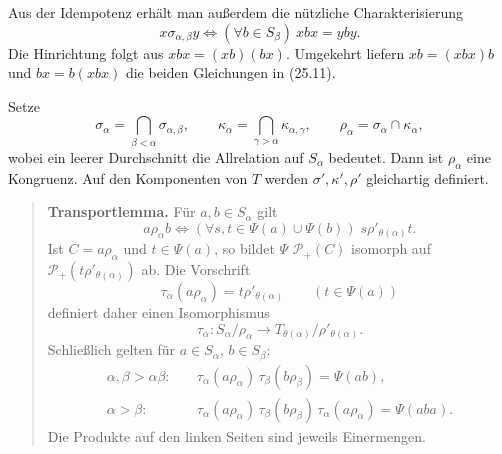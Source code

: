 \documentclass[main.tex]{subfiles}
\begin{document}
Aus der Idempotenz erhält man außerdem die nützliche Charakterisierung
\[
 x\mathrel{\sigma_{\alpha,\beta}}y
 \iff
 (\forall b\in S_\beta)\ xbx=yby.                         \tag{25.13}
\]
Die Hinrichtung folgt aus
\(xbx=(xb)(bx)\).  Umgekehrt liefern
\(xb=(xbx)b\) und \(bx=b(xbx)\) die beiden Gleichungen in
(25.11).

Setze
\[
 \sigma_\alpha=\bigcap_{\beta<\alpha}\sigma_{\alpha,\beta},
 \qquad
 \kappa_\alpha=\bigcap_{\gamma>\alpha}\kappa_{\alpha,\gamma},
 \qquad
 \rho_\alpha=\sigma_\alpha\cap\kappa_\alpha,             \tag{25.14}
\]
wobei ein leerer Durchschnitt die Allrelation auf \(S_\alpha\) bedeutet.
Dann ist \(\rho_\alpha\) eine Kongruenz.  Auf den Komponenten von \(T\)
werden \(\sigma',\kappa',\rho'\) gleichartig definiert.

\begin{quote}
\textbf{Transportlemma.}
Für \(a,b\in S_\alpha\) gilt
\[
 a\mathrel{\rho_\alpha}b
 \iff
 (\forall s,t\in\Psi(a)\cup\Psi(b))\;
 s\mathrel{\rho'_{\theta(\alpha)}}t.                    \tag{25.15}
\]
Ist \(C=a\rho_\alpha\) und \(t\in\Psi(a)\), so bildet \(\Psi\)
\(\mathcal P_+(C)\) isomorph auf
\(\mathcal P_+(t\rho'_{\theta(\alpha)})\) ab.  Die Vorschrift
\[
 \tau_\alpha(a\rho_\alpha)
   =t\rho'_{\theta(\alpha)}\qquad(t\in\Psi(a))            \tag{25.16}
\]
definiert daher einen Isomorphismus
\[
 \tau_\alpha\colon S_\alpha/\rho_\alpha
    \longrightarrow T_{\theta(\alpha)}/\rho'_{\theta(\alpha)}.
                                                                  \tag{25.17}
\]
Schließlich gelten für \(a\in S_\alpha\), \(b\in S_\beta\):
\begin{align}
 \alpha,\beta>\alpha\beta:\quad&
 \tau_\alpha(a\rho_\alpha)\,
 \tau_\beta(b\rho_\beta)=\Psi(ab),                       \tag{25.18}\\[2mm]
 \alpha>\beta:\quad&
 \tau_\alpha(a\rho_\alpha)\,
 \tau_\beta(b\rho_\beta)\,
 \tau_\alpha(a\rho_\alpha)=\Psi(aba).                    \tag{25.19}
\end{align}
Die Produkte auf den linken Seiten sind jeweils Einermengen.
\end{quote}
\end{document}
